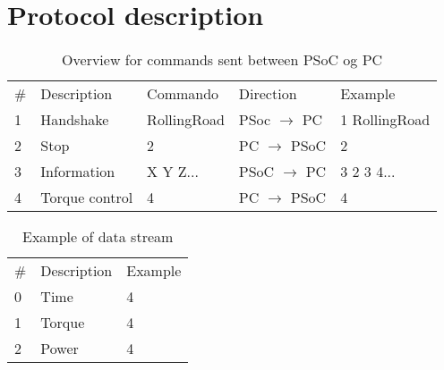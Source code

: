 \section{Protocol description}

\begin{table}[h!]
	\centering
	\label{Protocol:overview}
	\begin{tabular}{lllll}
		\# & Description & Commando    & Direction                    & Example       \\
		1  & Handshake   & RollingRoad & PSoc $\rightarrow$ PC          & 1 RollingRoad \\
		2  & Stop        & 2           & PC $\rightarrow$ PSoC          & 2        \\
		3  & Information & X Y Z...    & PSoC $\rightarrow$ PC          & 3 2 3 4...    \\
		4  & Torque control & 4        & PC $\rightarrow$ PSoC          & 4    \\
	\end{tabular}
	\caption{Overview for commands sent between PSoC og PC}
\end{table}

\begin{table}[h!]
	\centering
	\label{Protocol:example}
	\begin{tabular}{lll}
		\# & Description & Example \\
		0  & Time        & 4       \\
		1  & Torque      & 4       \\
		2  & Power       & 4      
	\end{tabular}
	\caption{Example of data stream}
\end{table}